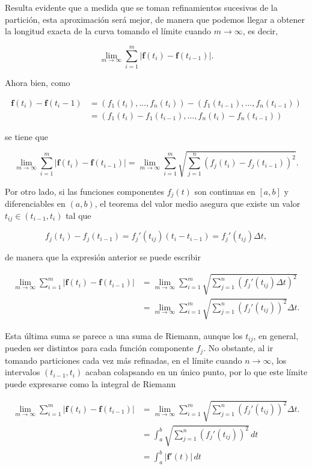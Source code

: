 \documentclass[
  a4paper,
]{scrreport}
\theoremstyle{plain}
\theoremstyle{plain}
\theoremstyle{definition}
\theoremstyle{definition}
\theoremstyle{plain}
\theoremstyle{definition}
\theoremstyle{remark}
\begin{document}
Resulta evidente que a medida que se toman refinamientos sucesivos de la
partición, esta aproximación será mejor, de manera que podemos llegar a
obtener la longitud exacta de la curva tomando el límite cuando
\(m\to\infty\), es decir,

\[
\lim_{m\to\infty}\sum_{i=1}^m |\mathbf{f}(t_i)-\mathbf{f}(t_{i-1})|.
\]

Ahora bien, como

\begin{align*}
\mathbf{f}(t_i)-\mathbf{f}(t_i-1) 
&= (f_1(t_i),\ldots,f_n(t_i))-(f_1(t_{i-1}),\ldots,f_n(t_{i-1})) \\
&= (f_1(t_i)-f_1(t_{i-1}),\ldots,f_n(t_i)-f_n(t_{i-1}))
\end{align*}

se tiene que

\[
\lim_{m\to\infty}\sum_{i=1}^m |\mathbf{f}(t_i)-\mathbf{f}(t_{i-1})| =
\lim_{m\to\infty}\sum_{i=1}^m \sqrt{\sum_{j=1}^n (f_j(t_i)-f_j(t_{i-1}))^2}.
\]

Por otro lado, si las funciones componentes \(f_j(t)\) son continuas en
\([a,b]\) y diferenciables en \((a,b)\), el teorema del valor medio
asegura que existe un valor \(t_{ij}\in(t_{i-1},t_i)\) tal que

\[
f_j(t_i)-f_j(t_{i-1}) = f_j'(t_{ij})(t_i-t_{i-1}) = f_j'(t_{ij}) \Delta t,
\]

de manera que la expresión anterior se puede escribir

\begin{align*}
\lim_{m\to\infty}\sum_{i=1}^m |\mathbf{f}(t_i)-\mathbf{f}(t_{i-1})| 
&= \lim_{m\to\infty}\sum_{i=1}^m \sqrt{\sum_{j=1}^n (f_j'(t_{ij})\Delta t)^2} \\
&= \lim_{m\to\infty}\sum_{i=1}^m \sqrt{\sum_{j=1}^n (f_j'(t_{ij}))^2}\Delta t.
\end{align*}

Esta última suma se parece a una suma de Riemann, aunque los \(t_{ij}\),
en general, pueden ser distintos para cada función componente \(f_j\).
No obstante, al ir tomando particiones cada vez más refinadas, en el
límite cuando \(n\to\infty\), los intervalos \((t_{i-1},t_i)\) acaban
colapsando en un único punto, por lo que este límite puede expresarse
como la integral de Riemann

\begin{align*}
\lim_{m\to\infty}\sum_{i=1}^m |\mathbf{f}(t_i)-\mathbf{f}(t_{i-1})| 
&= \lim_{m\to\infty}\sum_{i=1}^m \sqrt{\sum_{j=1}^n (f_j'(t_{ij}))^2}\Delta t. \\
&= \int_a^b \sqrt{\sum_{j=1}^n (f_j'(t_{ij}))^2}\, dt \\
&= \int_a^b |\mathbf{f}'(t)|\, dt
\end{align*}
\end{document}
